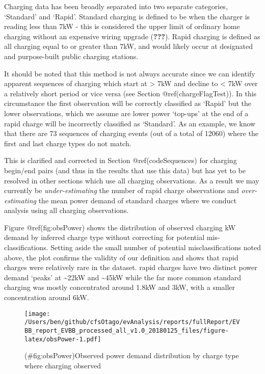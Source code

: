 \documentclass[]{article}
\begin{document}
Charging data has been broadly separated into two separate categories, `Standard' and `Rapid'. Standard charging is defined to be when the charger is reading less than 7kW - this is considered the upper limit of ordinary home charging without an expensive wiring upgrade ({\textbf{???}}). Rapid charging is defined as all charging equal to or greater than 7kW, and would likely occur at designated and purpose-built public charging stations.

It should be noted that this method is not always accurate since we can identify apparent sequences of charging which start at \textgreater{} 7kW and decline to \textless{} 7kW over a relatively short period or vice versa (see Section @ref(chargeFlagTest)). In this circumstance the first observation will be correctly classified as `Rapid' but the lower observations, which we assume are lower power `top-ups' at the end of a rapid charge will be incorrectly classified as `Standard'. As an example, we know that there are 73 sequences of charging events (out of a total of 12060) where the first and last charge types do not match.

This is clarified and corrected in Section @ref(codeSequences) for charging begin/end pairs (and thus in the results that use this data) but has yet to be resolved in other sections which use all charging observations. As a result we may currently be \emph{under-estimating} the number of rapid charge observations and \emph{over-estimating} the mean power demand of standard charges where we conduct analysis using all charging observations.

Figure @ref(fig:obsPower) shows the distribution of observed charging kW demand by inferred charge type without correcting for potential mis-classifications. Setting aside the small number of potential misclassifications noted above, the plot confirms the validity of our definition and shows that rapid charges were relatively rare in the dataset. rapid charges have two distinct power demand `peaks' at \textasciitilde{}22kW and \textasciitilde{}45kW while the far more common standard charging was mostly concentrated around 1.8kW and 3kW, with a smaller concentration around 6kW.

\begin{figure}
\centering
\texttt{[image: /Users/ben/github/cfsOtago/evAnalysis/reports/fullReport/EVBB\_report\_EVBB\_processed\_all\_v1.0\_20180125\_files/figure-latex/obsPower-1.pdf]}
\caption{(\#fig:obsPower)Observed power demand distribution by charge type where charging observed}
\end{figure}
\end{document}
